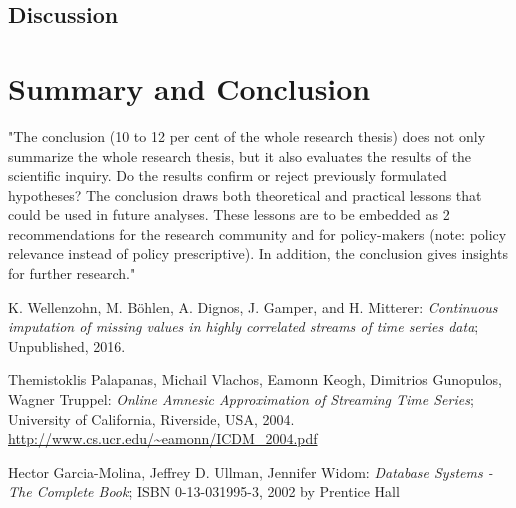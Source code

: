 \documentclass[abstracton,12pt]{scrreprt}
\begin{document}
\section{Discussion}

\chapter{Summary and Conclusion}
\label{sec:Summary}
"The conclusion (10 to 12 per cent of the whole research thesis) does not only summarize the whole research thesis, but it also evaluates the results of the scientific inquiry. Do the results confirm or reject previously formulated hypotheses? The conclusion draws both theoretical and practical lessons that could be used in future analyses. These lessons are to be embedded as
2
recommendations for the research community and for policy-makers (note: policy relevance instead of policy prescriptive). In addition, the conclusion gives insights for further research."

\begin{thebibliography}{99}
	
	
	 K. Wellenzohn, M. Böhlen, A. Dignos, J. Gamper, and H. Mitterer: \emph{Continuous imputation of missing values in highly correlated streams of time series data}; Unpublished, 2016.
	
	 Themistoklis Palapanas, Michail Vlachos, Eamonn Keogh, Dimitrios Gunopulos, Wagner Truppel: \emph{Online Amnesic Approximation of Streaming Time Series}; University of California, Riverside, USA, 2004. \url{http://www.cs.ucr.edu/~eamonn/ICDM_2004.pdf}

	 Hector Garcia-Molina, Jeffrey D. Ullman, Jennifer Widom: \emph{Database Systems - The Complete Book}; ISBN 0-13-031995-3, 2002 by Prentice Hall
		
	



\end{thebibliography}
\end{document}
